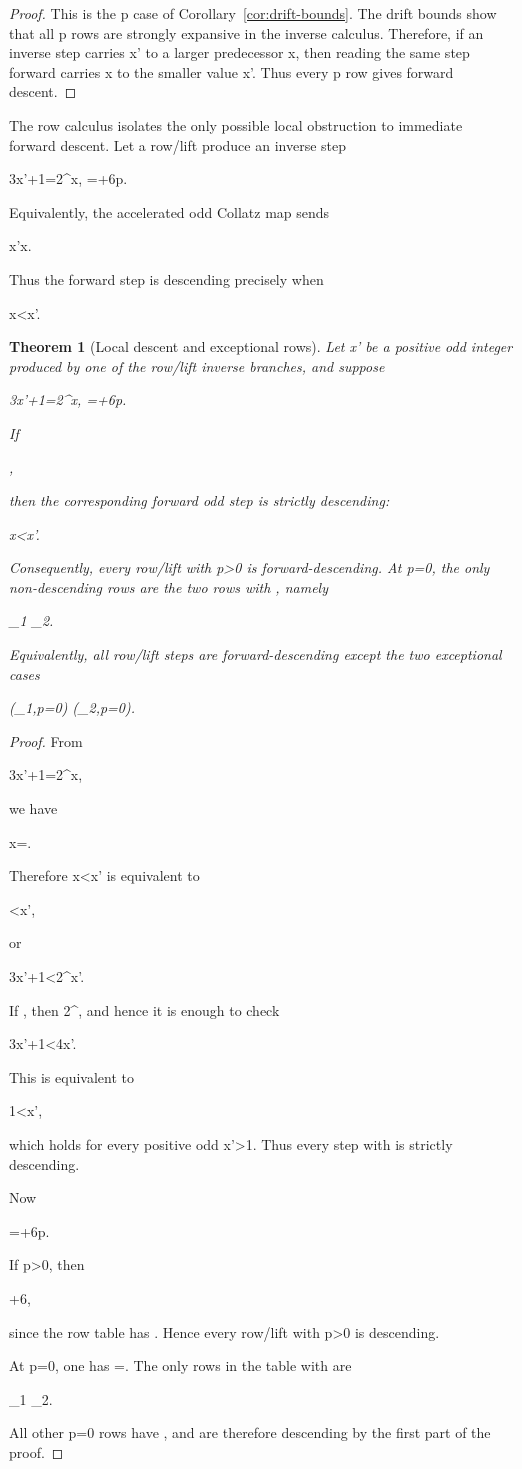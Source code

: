 \documentclass[11pt,letterpaper]{amsart}
\def\({}%
\def\){}%
\def\[{ }%
\def\]{ }%
\theoremstyle{definition}
\theoremstyle{plain}
\newtheorem{theorem}{Theorem}
\theoremstyle{plain}
\theoremstyle{remark}
\begin{document}
\begin{proof}
This is the \(p\) case of Corollary~\ref{cor:drift-bounds}.  The
drift bounds show that all \(p\) rows are strongly expansive in the
inverse calculus.  Therefore, if an inverse step carries \(x'\) to a
larger predecessor \(x\), then reading the same step forward carries
\(x\) to the smaller value \(x'\).  Thus every \(p\) row gives
forward descent.
\end{proof}

The row calculus isolates the only possible local obstruction to immediate
forward descent.  Let a row/lift produce an inverse step
\[
3x'+1=2^\sigma x,
\qquad
\sigma=\alpha+6p.
\]
Equivalently, the accelerated odd Collatz map sends
\[
x'\longmapsto x.
\]
Thus the forward step is descending precisely when
\[
x<x'.
\]

\begin{theorem}[Local descent and exceptional rows]
\label{thm:local-descent-exceptional-rows}
Let \(x'\) be a positive odd integer produced by one of the row/lift
inverse branches, and suppose
\[
3x'+1=2^\sigma x,
\qquad
\sigma=\alpha+6p.
\]
If
\[
\sigma{},
\]
then the corresponding forward odd step is strictly descending:
\[
x<x'.
\]

Consequently, every row/lift with \(p>0\) is forward-descending.  At
\(p=0\), the only non-descending rows are the two rows with
\(\), namely
\[
\omega_1
\qquad{}\qquad
\Omega_2.
\]
Equivalently, all row/lift steps are forward-descending except the two
exceptional cases
\[
(\omega_1,p=0)
\qquad{}\qquad
(\Omega_2,p=0).
\]
\end{theorem}

\begin{proof}
From
\[
3x'+1=2^\sigma x,
\]
we have
\[
x=.
\]
Therefore \(x<x'\) is equivalent to
\[
<x',
\]
or
\[
3x'+1<2^\sigma x'.
\]
If \(\sigma{}\), then \(2^\sigma{}\), and hence it is enough to
check
\[
3x'+1<4x'.
\]
This is equivalent to
\[
1<x',
\]
which holds for every positive odd \(x'>1\).  Thus every step with
\(\sigma{}\) is strictly descending.

Now
\[
\sigma=\alpha+6p.
\]
If \(p>0\), then
\[
\sigma\ge \alpha+6,
\]
since the row table has \(\alpha{}\).  Hence every row/lift with
\(p>0\) is descending.

At \(p=0\), one has \(\sigma=\alpha\).  The only rows in the table with
\(\) are
\[
\omega_1
\qquad{}\qquad
\Omega_2.
\]
All other \(p=0\) rows have \(\alpha{}\), and are therefore
descending by the first part of the proof.
\end{proof}
\end{document}
